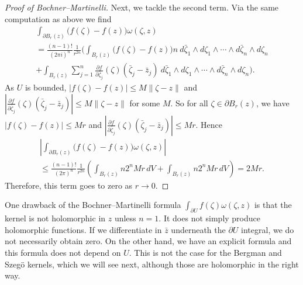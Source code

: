 \documentclass[12pt,openany]{book}
\newcommand{\snorm}[1]{\lVert {#1} \rVert}
\newcommand{\abs}[1]{\left\lvert {#1} \right\rvert}
\theoremstyle{plain}
\theoremstyle{remark}
\theoremstyle{definition}
\theoremstyle{exercise}
\theoremstyle{example}
\begin{document}
\begin{proof}[Proof of Bochner--Martinelli]
Next, we tackle the second term.
Via the same computation as above we find
\begin{multline*}
\int_{\partial B_r(z)}
\bigl(f(\zeta)-f(z)\bigr)
\omega(\zeta,z)
\\
=
\frac{(n-1)!}{{(2\pi i)}^n}\frac{1}{r^{2n}}
\Biggl(
\int_{B_r(z)}
\bigl(f(\zeta)-f(z)\bigr)
n~
d\bar{\zeta}_1 \wedge d\zeta_1 \wedge
\cdots \wedge
d\bar{\zeta}_n \wedge d\zeta_n
\\
+
\int_{B_r(z)}
\sum_{j=1}^n
\frac{\partial f}{\partial \bar{\zeta}_j}(\zeta)
(\bar{\zeta}_j-\bar{z}_j)
~
d\bar{\zeta}_1 \wedge d\zeta_1 \wedge
\cdots \wedge
d\bar{\zeta}_n \wedge d\zeta_n \Biggr).
\end{multline*}
As $U$ is bounded, $\abs{f(\zeta)-f(z)} \leq M
\snorm{\zeta-z}$
and
$\abs{\frac{\partial f}{\partial \bar{\zeta}_j}(\zeta)
(\bar{\zeta}_j-\bar{z}_j)} \leq M \snorm{\zeta-z}$ for some $M$.
So 
for all $\zeta \in \partial B_r(z)$,
we have
$\abs{f(\zeta)-f(z)} \leq Mr$
and $\abs{\frac{\partial f}{\partial \bar{\zeta}_j}(\zeta)
(\bar{\zeta}_j-\bar{z}_j)} \leq Mr$.
Hence
\begin{multline*}
\abs{
\int_{\partial B_r(z)}
\bigl(f(\zeta)-f(z)\bigr)
\omega(\zeta,z)
}
\\
\leq
\frac{(n-1)!}{{(2\pi)}^n}\frac{1}{r^{2n}}
\left(
\int_{B_r(z)}
n 2^n Mr \, dV
+
\int_{B_r(z)}
n 2^n Mr \, dV
\right)
=
2 M r .
\end{multline*}
Therefore, this term goes to zero as $r \to 0$.
\end{proof}

One drawback of the Bochner--Martinelli formula $\int_{\partial U} f(\zeta)
\omega(\zeta,z)$ is that the kernel is not
holomorphic in $z$ unless $n=1$.  It does not simply produce
holomorphic functions.  If we differentiate in $\bar{z}$ underneath the
$\partial U$ integral, we do not necessarily obtain zero.
On the other hand, we have an explicit formula and this formula does not
depend on $U$.  This is not the case for the Bergman and Szeg\"o
kernels, which we will see next, although those are holomorphic in the
right way.
\end{document}
